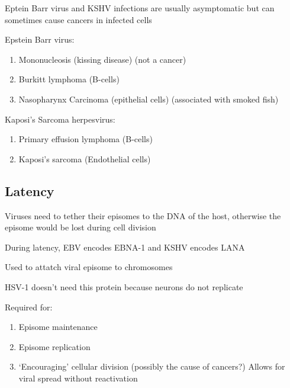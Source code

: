 \documentclass{notes}
\begin{document}
Eptein Barr virus and KSHV infections are usually asymptomatic but can sometimes cause cancers in infected cells

Epstein Barr virus:

\begin{enumerate}
    \item Mononucleosis (kissing disease) (not a cancer)
    \item Burkitt lymphoma (B-cells)
    \item Nasopharynx Carcinoma (epithelial cells) (associated with smoked fish)
\end{enumerate}

Kaposi's Sarcoma herpesvirus:

\begin{enumerate}
    \item Primary effusion lymphoma (B-cells)
    \item Kaposi's sarcoma (Endothelial cells)
\end{enumerate}

\subsection{Latency}

Viruses need to tether their episomes to the DNA of the host, otherwise the episome would be lost during cell division

During latency, EBV encodes EBNA-1 and KSHV encodes LANA

\tab Used to attatch viral episome to chromosomes

\tab HSV-1 doesn't need this protein because neurons do not replicate


Required for:

\begin{enumerate}
    \item Episome maintenance
    \item Episome replication
    \item `Encouraging' cellular division (possibly the cause of cancers?)
    \subitem Allows for viral spread without reactivation
\end{enumerate}
\end{document}
